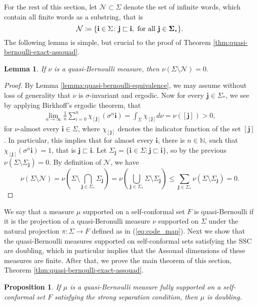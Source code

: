 \documentclass{PRM}
\newcommand{\field}[1]{\mathbb{#1}}
\newcommand{\N}{\field{N}}
\theoremstyle{plain}
\newtheorem{lemma}[thm]{Lemma}
\newtheorem{prop}[thm]{Proposition}
\theoremstyle{definition}
\theoremstyle{remark}
\begin{document}
For the rest of this section, let $\mathcal{N}\subset \Sigma$ denote the set of infinite words, which contain all finite words as a substring, that is 
\begin{equation*}
    \mathcal{N}\coloneqq \{\mathbf{i}\in\Sigma\colon \mathbf{j}\sqsubset \mathbf{i},\textnormal{ for all }\mathbf{j\in\Sigma_*}\}.
\end{equation*}
The following lemma is simple, but crucial to the proof of Theorem \ref{thm:quasi-bernoulli-exact-assouad}.

\begin{lemma}\label{lemma:quasi-normal}
If $\nu$ is a quasi-Bernoulli measure, then $\nu(\Sigma\setminus\mathcal{N})=0$.
\end{lemma}
\begin{proof}
By Lemma \ref{lemma:quasi-bernoulli-equivalence}, we may assume without loss of generality that $\nu$ is $\sigma$-invariant and ergodic. Now for every $\mathbf{j}\in\Sigma_*$, we see by applying Birkhoff's ergodic theorem, that
\begin{align*}
    \lim_{n\to\infty}\frac{1}{n}\sum_{i=0}^{n}\chi_{[\mathbf{j}]}(\sigma^n\mathbf{i})=\int_{\Sigma}\chi_{[\mathbf{j}]}d\nu = \nu([\mathbf{j}])>0,
\end{align*}
for $\nu$-almost every $\mathbf{i}\in\Sigma$, where $\chi_{[\mathbf{j}]}$ denotes the indicator function of the set $[\mathbf{j}]$. In particular, this implies that for almost every $\mathbf{i}$, there is $n\in\N$, such that $\chi_{[\mathbf{j}]}(\sigma^n\mathbf{i})=1$, that is $\mathbf{j}\sqsubset\mathbf{i}$. Let $\Sigma_{\mathbf{j}}=\{\mathbf{i}\in\Sigma\colon \mathbf{j}\sqsubset\mathbf{i}\}$, so by the previous $\nu(\Sigma\setminus\Sigma_{\mathbf{j}})=0$. By definition of $\mathcal{N}$, we have
\begin{equation*}
    \nu(\Sigma\setminus\mathcal{N})=\nu\left(\Sigma\setminus\bigcap_{\mathbf{j}\in\Sigma_*}\Sigma_{\mathbf{j}}\right)=\nu\left(\bigcup_{\mathbf{j}\in\Sigma_*}\Sigma\setminus\Sigma_{\mathbf{j}}\right)\leq \sum_{\mathbf{j}\in\Sigma_*}\nu(\Sigma\setminus\Sigma_{\mathbf{j}})=0.
\end{equation*}
\end{proof}
We say that a measure $\mu$ supported on a self-conformal set $F$ is quasi-Bernoulli if it is the projection of a quasi-Beronulli measure $\nu$ supported on $\Sigma$ under the natural projection $\pi\colon\Sigma\to F$ defined as in (\ref{eq:code_map}). Next we show that the quasi-Bernoulli measures supported on self-conformal sets satisfying the SSC are doubling, which in particular implies that the Assouad dimensions of these measures are finite. After that, we prove the main theorem of this section, Theorem \ref{thm:quasi-bernoulli-exact-assouad}.
\begin{prop}\label{prop:doubling}
If $\mu$ is a quasi-Bernoulli measure fully supported on a self-conformal set $F$ satisfying the strong separation condition, then $\mu$ is doubling.
\end{prop}
\end{document}
